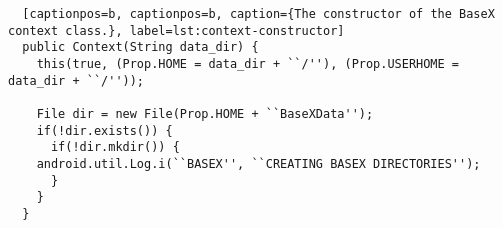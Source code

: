 \begin{lstlisting}	[captionpos=b, captionpos=b, caption={The constructor of the BaseX context class.}, label=lst:context-constructor] 		        	   
  public Context(String data_dir) {
    this(true, (Prop.HOME = data_dir + ``/''), (Prop.USERHOME = data_dir + ``/''));
	  	
    File dir = new File(Prop.HOME + ``BaseXData'');
    if(!dir.exists()) {
      if(!dir.mkdir()) {
	android.util.Log.i(``BASEX'', ``CREATING BASEX DIRECTORIES'');
      }  
    }
  }
\end{lstlisting} 
